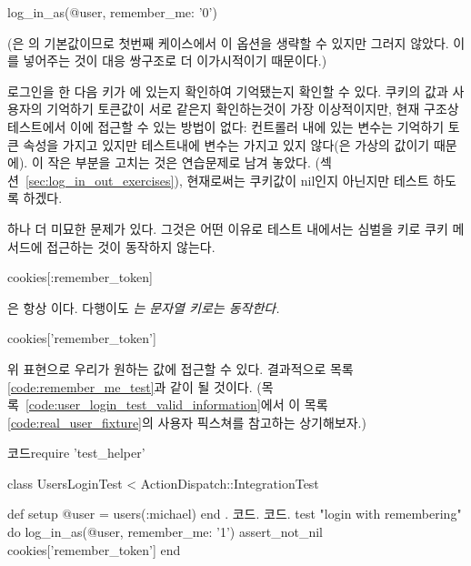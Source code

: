 {{%
\begin{code} log_in_as(@user, remember_me: '0') \end{code} 

\noindent (은 의 기본값이므로 첫번째 케이스에서 이 옵션을 생략할 수 있지만 그러지 않았다. 이를 넣어주는 것이 대응 쌍구조로 더 이가시적이기 때문이다.) 

로그인을 한 다음  키가 에 있는지 확인하여 기억됐는지 확인할 수 있다. 쿠키의 값과 사용자의 기억하기 토큰값이 서로 같은지 확인하는것이 가장 이상적이지만, 현재 구조상 테스트에서 이에 접근할 수 있는 방법이 없다: 컨트롤러 내에 있는  변수는 기억하기 토큰 속성을 가지고 있지만 테스트내에  변수는 가지고 있지 않다(은 가상의 값이기 때문에). 이 작은 부분을 고치는 것은 연습문제로 남겨 놓았다. (섹션~\ref{sec:log_in_out_exercises}), 현재로써는 쿠키값이 {nil}인지 아닌지만 테스트 하도록 하겠다. 

하나 더 미묘한 문제가 있다. 그것은 어떤 이유로 테스트 내에서는 심벌을 키로 쿠키 메서드에 접근하는 것이 동작하지 않는다. 

\begin{code} cookies[:remember_token] \end{code} 

\noindent 은 항상 이다. 다행이도  \emph{는 문자열 키로는 동작한다.} 

\begin{code} cookies['remember_token'] \end{code} 

\noindent 위 표현으로 우리가 원하는 값에 접근할 수 있다. 결과적으로 목록 \ref{code:remember_me_test}과 같이 될 것이다. (목록~\ref{code:user_login_test_valid_information}에서 이 목록 \ref{code:real_user_fixture}의 사용자 픽스쳐를 참고하는 상기해보자.) 

\begin{codelisting} \label{code:remember_me_test}  

\begin{code} 코드require 'test_helper' 

class UsersLoginTest < ActionDispatch::IntegrationTest 

def setup @user = users(:michael) end . 코드. 코드. test "login with remembering" do log_in_as(@user, remember_me: '1') assert_not_nil cookies['remember_token'] end 


\end{code}
\end{codelisting}}}
